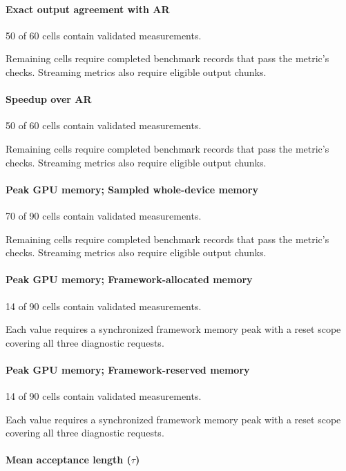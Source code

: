 \documentclass[conference,onecolumn]{IEEEtran}
\begin{document}
\paragraph*{Exact output agreement with AR}

50 of 60 cells contain validated measurements.

Remaining cells require completed benchmark records that pass the metric's checks. Streaming metrics also require eligible output chunks.

\paragraph*{Speedup over AR}

50 of 60 cells contain validated measurements.

Remaining cells require completed benchmark records that pass the metric's checks. Streaming metrics also require eligible output chunks.

\paragraph*{Peak GPU memory; Sampled whole-device memory}

70 of 90 cells contain validated measurements.

Remaining cells require completed benchmark records that pass the metric's checks. Streaming metrics also require eligible output chunks.

\paragraph*{Peak GPU memory; Framework-allocated memory}

14 of 90 cells contain validated measurements.

Each value requires a synchronized framework memory peak with a reset scope covering all three diagnostic requests.

\paragraph*{Peak GPU memory; Framework-reserved memory}

14 of 90 cells contain validated measurements.

Each value requires a synchronized framework memory peak with a reset scope covering all three diagnostic requests.

\paragraph*{Mean acceptance length (\(\tau\))}
\end{document}
